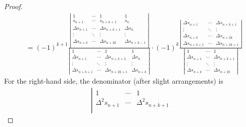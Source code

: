 \begin{proof}
\begin{equation}
\begin{aligned}
        &=(-1)^{k+1}\frac{\left| \begin{matrix}
            1 & \cdots & 1 & 1\\
            s_{n+1} & \cdots & s_{n+k+1} & s_n\\ 
            \Delta s_{n+1} & \cdots & \Delta s_{n+k+1} & \Delta s_n \\
            \vdots & \ddots & \vdots & \vdots \\
            \Delta s_{n+k} & \cdots & \Delta s_{n+2k} & \Delta s_{n+k-1} \\
        \end{matrix}   \right|}{\left|  \begin{matrix}
            1 & \cdots & 1 & 1\\ 
            \Delta s_{n+1} & \cdots & \Delta s_{n+k+2} & \Delta s_n \\
            \vdots & \ddots & \vdots & \vdots  \\
            \Delta s_{n+k+1} & \cdots & \Delta s_{n+2k+1} & \Delta s_{n+k}
        \end{matrix}    \right|} \cdot (-1)^k\frac{\left| \begin{matrix}
            \Delta s_{n+1} & \cdots & \Delta s_{n+k+1} \\
            \vdots & \ddots & \vdots \\
            \Delta s_{n+k} & \cdots & \Delta s_{n+2k}\\
            \Delta s_{n+k+1} & \cdots & \Delta s_{n+2k+1}
        \end{matrix}   \right|
        }{ \left|  \begin{matrix}
            1 & \cdots & 1 \\ 
            \Delta s_{n+1} & \cdots & \Delta s_{n+k+1} \\
            \vdots & \ddots & \vdots \\
            \Delta s_{n+k} & \cdots & \Delta s_{n+2k}
        \end{matrix}    \right| } 
    \end{aligned}
    \end{equation}
    For the right-hand side, the denominator (after slight arrangements) is 
    \begin{equation}
    \begin{aligned}
        \left|\begin{matrix}
            1 & \cdots & 1 \\
            \Delta^2 s_{n+1} & \cdots &\Delta^2 s_{n + k + 1} \\

\end{matrix}
\end{aligned}
\end{equation}
\end{proof}
